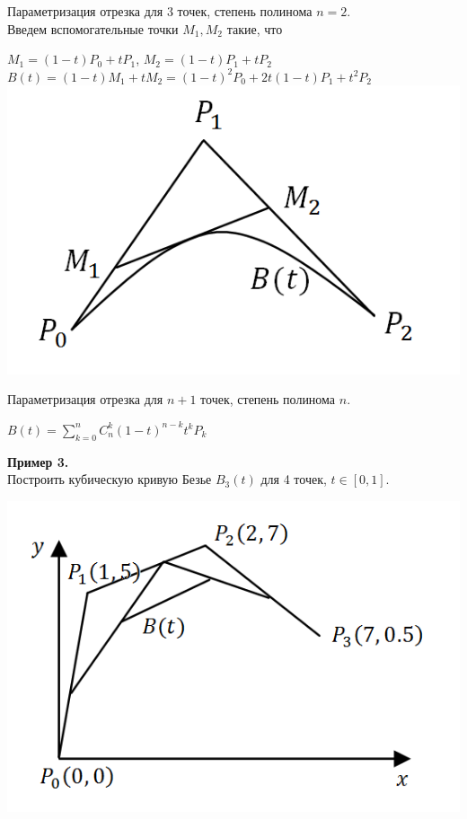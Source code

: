 \documentclass[12pt]{article}
\theoremstyle{definition}
\numberwithin{equation}{section}
\begin{document}
	Параметризация отрезка для 3 точек, степень полинома $n = 2$.\\
	Введем вспомогательные точки $M_1, M_2$ такие, что \begin{center}$M_1 = (1-t)P_0+tP_1$, $M_2 = (1-t)P_1+tP_2$\\
		$B(t) = (1-t)M_1+tM_2 = (1-t)^2P_0+2t(1-t)P_1+t^2P_2$\\
		\includegraphics[scale=0.5]{l3_8.png}\end{center}
	Параметризация отрезка для $n+1$ точек, степень полинома $n$.
	\begin{center}$B(t) = \sum\limits_{k=0}^n C_n^k (1-t)^{n-k}t^kP_k$\end{center}
	\noindent \textbf{Пример 3.}\\
	Построить кубическую кривую Безье $B_3(t)$ для 4 точек, $t\in [0, 1]$.\begin{center}
		\includegraphics[scale=0.7]{l3_9.png}\end{center}
\end{document}
